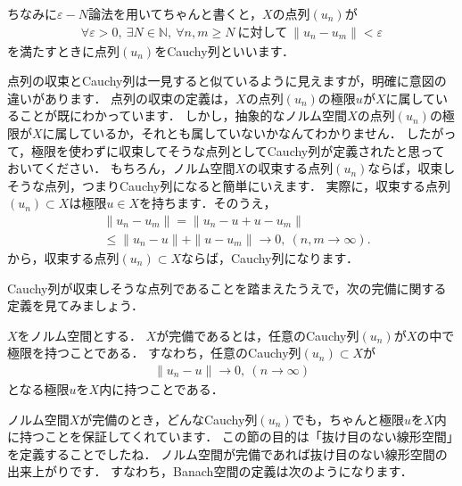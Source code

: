 ちなみに$\varepsilon - N$論法を用いてちゃんと書くと，$X$の点列$(u_n)$が
\begin{align*}
  \forall \varepsilon > 0, ~ \exists N \in {\mathbb N}, ~ \forall n, m \ge N ~ \mbox{に対して} ~ \| u_n - u_m \| < \varepsilon
\end{align*}
を満たすときに点列$(u_n)$をCauchy列といいます．

点列の収束とCauchy列は一見すると似ているように見えますが，明確に意図の違いがあります．
点列の収束の定義は，$X$の点列$(u_n)$の極限$u$が$X$に属していることが既にわかっています．
しかし，抽象的なノルム空間$X$の点列$(u_n)$の極限が$X$に属しているか，それとも属していないかなんてわかりません．
したがって，極限を使わずに収束してそうな点列としてCauchy列が定義されたと思っておいてください．
もちろん，ノルム空間$X$の収束する点列$(u_n)$ならば，収束しそうな点列，つまりCauchy列になると簡単にいえます．
実際に，収束する点列$(u_n) \subset X$は極限$u \in X$を持ちます．そのうえ，
\begin{align*}
&\| u_n - u_m \| = \| u_n - u + u - u_m \| \\
&\le \| u_n - u \| + \| u - u_m \| \rightarrow 0, ~ (n, m \rightarrow \infty).
\end{align*}
から，収束する点列$(u_n) \subset X$ならば，Cauchy列になります．


Cauchy列が収束しそうな点列であることを踏まえたうえで，次の完備に関する定義を見てみましょう．

\begin{defi}[完備]\label{def:App:Comp}
$X$をノルム空間とする．
$X$が完備であるとは，任意のCauchy列$(u_n)$が$X$の中で極限を持つことである．
すなわち，任意のCauchy列$(u_n) \subset X$が
\begin{align*}
\| u_n - u \| \rightarrow 0, ~ (n \rightarrow \infty)
\end{align*}
となる極限$u$を$X$内に持つことである．
\end{defi}

ノルム空間$X$が完備のとき，どんなCauchy列$(u_n)$でも，ちゃんと極限$u$を$X$内に持つことを保証してくれています．
この節の目的は「抜け目のない線形空間」を定義することでしたね．
ノルム空間が完備であれば抜け目のない線形空間の出来上がりです．
すなわち，Banach空間の定義は次のようになります．

